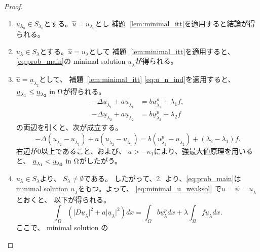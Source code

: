 \begin{proof}
 \begin{enumerate}
  \item $u_{\lambda_0} \in S_{\lambda_0}$とする。$\hat{u} =
        u_{\lambda_0}$とし
        補題~\ref{lem:minimal_itt}を適用すると結論が得られる。
  \item $u_{\lambda} \in S_{\lambda}$とする。$\hat{u} =
        u_{\lambda}$として
        補題~\ref{lem:minimal_itt}を適用すると、
        \ref{eq:prob_main}の
        minimal solution $\underline{u}_\lambda$が得られる。
  \item $\hat{u} = \underline{u}_{\lambda_2}$として、
        補題~\ref{lem:minimal_itt}
        \eqref{eq:u_n_ind}を適用すると、
        $\underline{u}_{\lambda_1} \leq
        \underline{u}_{\lambda_2} ~\text{in}~ \Omega$が得られる。
        \begin{align*}
         -\Delta \underline{u}_{\lambda_1} + a
         \underline{u}_{\lambda_1} 
         &= b \underline{u}_{\lambda_1}^p + \lambda_1 f, \\
         -\Delta \underline{u}_{\lambda_2} + a
         \underline{u}_{\lambda_2} 
         &= b \underline{u}_{\lambda_2}^p + \lambda_2 f
        \end{align*}
        の両辺を引くと、次が成立する。
        \[
         -\Delta (\underline{u}_{\lambda_2} - \underline{u}_{\lambda_1}) + a
         (\underline{u}_{\lambda_2} - \underline{u}_{\lambda_1} )
         = b (\underline{u}_{\lambda_2}^p -
        \underline{u}_{\lambda_2}) + (\lambda_2 - \lambda_1) f.
        \]
        右辺が$0$以上であること、および、
        $a > -\kappa_1$により、強最大値原理を用いると、
        $\underline{u}_{\lambda_1} <
        \underline{u}_{\lambda_2} ~\text{in}~ \Omega$がしたがう。
  \item $u_\lambda \in S_\lambda$より、
        $S_\lambda \neq \emptyset$である。
        したがって、2.~より、\ref{eq:prob_main}は minimal solution
        $\underline{u}_\lambda$をもつ。よって、
        \eqref{eq:minimal_u_weaksol}
        で$u = \psi = \underline{u}_\lambda$とおくと、
        以下が得られる。
        \begin{equation}
         \int_\Omega \left( \lvert D\underline{u}_\lambda \rvert^2 + a
                      \lvert \underline{u}_\lambda \rvert^2 \right) dx 
          = \int_\Omega b\underline{u}_\lambda^p dx 
          + \lambda \int_\Omega f \underline{u}_\lambda dx.
          \label{eq:minimal_inp_same_weak}
        \end{equation}
        ここで、
        minimal solution の

\end{enumerate}
\end{proof}

